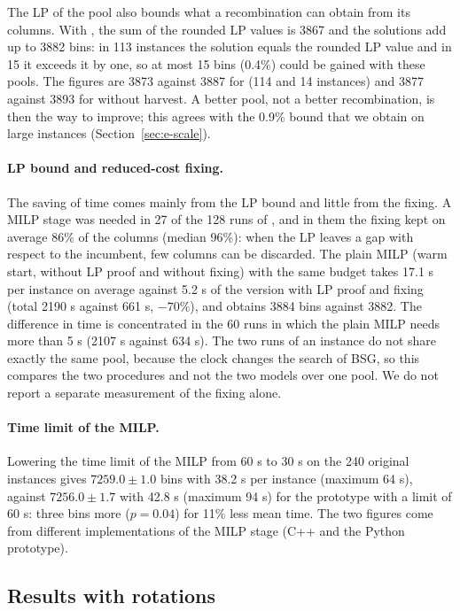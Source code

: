 The LP of the pool also bounds what a recombination can obtain from its columns. With \cfgbal{}, the sum of the rounded LP values is 3867 and the solutions add up to 3882 bins: in 113 instances the
solution equals the rounded LP value and in 15 it exceeds it by one, so at most 15 bins (0.4\%) could be gained with these pools. The figures are 3873 against 3887 for \cfgfast{} (114 and 14 instances) and 3877 against 3893 for \cfgfast{} without harvest. A better pool, not a better recombination, is
then the way to improve; this agrees with the 0.9\% bound that we obtain on large instances (Section~\ref{sec:e-scale}).

\paragraph{LP bound and reduced-cost fixing.}
The saving of time comes mainly from the LP bound and little from the fixing. A MILP stage was needed in 27 of the 128 runs of \cfgbal{}, and in them the fixing kept on average 86\% of the columns (median 96\%): when the LP
leaves a gap with respect to the incumbent, few columns can be discarded. The plain MILP (warm start, without LP proof and without fixing) with the same budget takes 17.1 s per instance on average against 5.2 s of the version with LP proof and fixing
(total 2190 s against 661 s, $-70\%$), and obtains 3884 bins against 3882. The difference in time is concentrated in the 60 runs in which the plain MILP needs more than 5 s (2107 s against 634 s). The two runs of an instance do not
share exactly the same pool, because the clock changes the search of BSG, so this compares the two procedures and not the two models over one pool. We do not report a separate measurement of the fixing alone.

\paragraph{Time limit of the MILP.}
Lowering the time limit of the MILP from 60 s to 30 s on the 240 original instances gives $7259.0\pm 1.0$ bins with 38.2 s per instance (maximum 64 s), against $7256.0\pm 1.7$ with 42.8 s (maximum 94 s) for the prototype with a limit of 60 s: three bins more
($p=0.04$) for 11\% less mean time. The two figures come from different implementations of the MILP stage (C++ and the Python prototype).

\subsection{Results with rotations}
\label{sec:e-rot}

